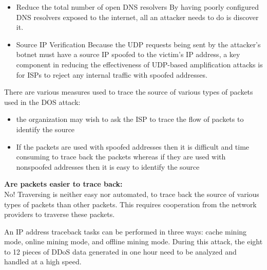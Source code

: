 \documentclass[../CIT288SecurityResearchNotebook.tex]{subfiles}
\begin{document}
\begin{itemize}
	\item{Reduce the total number of open DNS resolvers} By having 
	poorly configured DNS resolvers exposed to the internet, all an 
	attacker needs to do is discover it.
	\item{Source IP Verification} Because the UDP requests being sent by the
		attacker's botnet must have a source IP spoofed to the victim's IP
		address, a key component in reducing the effectiveness of UDP-based
		amplification attacks is for ISPs to reject any internal traffic with
		spoofed addresses.
\end{itemize}




There are various measures used to trace the source of various types of 
packets used in the DOS attack:

\begin{itemize}
	\item{the organization may wish to ask the ISP to trace the flow of packets to identify the source} 
\item{If the packets are used with spoofed addresses}  then it is difficult 
	and time consuming to trace back the packets whereas if they are used 
	with nonspoofed addresses then it is easy to identify the source
\end{itemize}

{\bf{Are packets easier to trace back:}}
\\No! Traversing is neither easy nor automated, to trace back the source 
of various types of packets than other packets. 
This requires cooperation from the network providers to traverse these packets.



An IP address traceback tasks can be performed in three ways: cache mining
mode, online mining mode, and offline mining mode. During this attack, the
eight to 12 pieces of DDoS data generated in one hour need to be analyzed and 
handled at a high speed.
\end{document}

